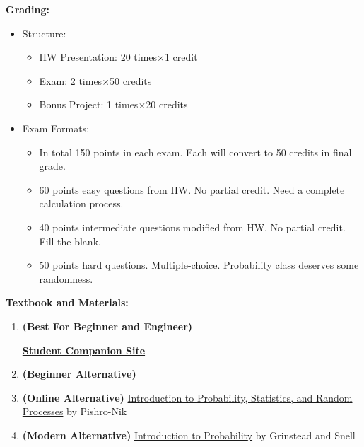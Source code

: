\documentclass{article}
\begin{document}
\textbf{Grading:} {
    \begin{itemize}
        \item Structure: {
            \begin{itemize}
                \item HW Presentation: 20 times$\times$1 credit
                \item Exam: 2 times$\times$50 credits
                \item Bonus Project: 1 times$\times$20 credits
            \end{itemize}
        }
        \item Exam Formats: {
            \begin{itemize}
                \item In total 150 points in each exam. Each will convert to 50 credits in final grade.
                \item 60 points easy questions from HW. No partial credit. Need a complete calculation process.
                \item 40 points intermediate questions modified from HW. No partial credit. Fill the blank.
                \item 50 points hard questions. Multiple-choice. Probability class deserves some randomness.
            \end{itemize}
        }
    \end{itemize}
}

\textbf{Textbook and Materials:} {
    \begin{enumerate}
        \item \textbf{(Best For Beginner and Engineer)} 

        \href{https://bcs.wiley.com/he-bcs/Books?action=index&itemId=1118324560&bcsId=8677}{\textbf{Student Companion Site}}
        \item \textbf{(Beginner Alternative)} 
        \item \textbf{(Online Alternative)} \href{https://www.probabilitycourse.com/}{Introduction to Probability, Statistics, and Random Processes} by Pishro-Nik
        \item \textbf{(Modern Alternative)} \href{https://www.stat.berkeley.edu/~aldous/134/grinstead.pdf}{Introduction to Probability} by Grinstead and Snell
    \end{enumerate}
}
\end{document}

